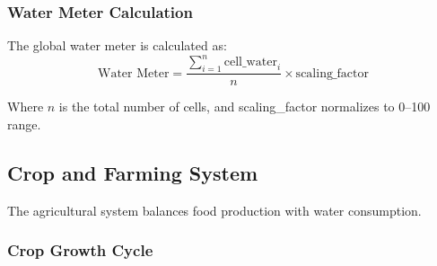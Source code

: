 \documentclass[12pt,a4paper]{article}
\begin{document}
\subsubsection{Water Meter Calculation}

The global water meter is calculated as:
\begin{equation}
\text{Water Meter} = \frac{\sum_{i=1}^{n} \text{cell\_water}_i}{n} \times \text{scaling\_factor}
\end{equation}

Where $n$ is the total number of cells, and scaling\_factor normalizes to 0--100 range.

\subsection{Crop and Farming System}

The agricultural system balances food production with water consumption.

\subsubsection{Crop Growth Cycle}
\end{document}
